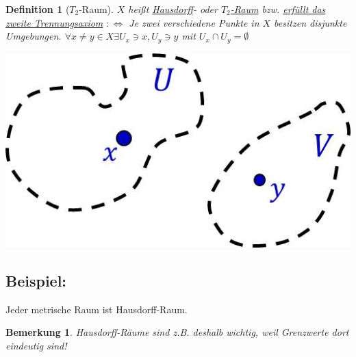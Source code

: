 \documentclass[a4paper,11pt,notitlepage]{report}
\newtheorem{definition}{Definition}[chapter]
\newtheorem{remark}{Bemerkung}[chapter]
\newenvironment{bsp}[1]
{
\setlength{\fboxsep}{10pt}
\subsection*{Beispiel: #1}
\begin{upshape}
}
{
\end{upshape}
}
\begin{document}
\begin{definition}[$T_2$-Raum]
	$X$ heißt \underline{Hausdorff}- oder \underline{$T_2$-Raum} bzw. \underline{erfüllt das zweite Trennungsaxiom} $:\Leftrightarrow$ Je zwei verschiedene Punkte in $X$ besitzen disjunkte Umgebungen.
	\newline
	$\forall x \neq y \in X \exists U_x \ni x, U_y \ni y$ mit $U_x \cap U_y = \emptyset$
\end{definition}
\begin{center}
\includegraphics[scale=0.4]{images/T2.jpg}
\end{center}

\begin{bsp}{}
	Jeder metrische Raum ist Hausdorff-Raum.
\end{bsp}

\begin{remark}
Hausdorff-Räume sind z.B. deshalb wichtig, weil Grenzwerte dort eindeutig sind!
\end{remark}
\end{document}
